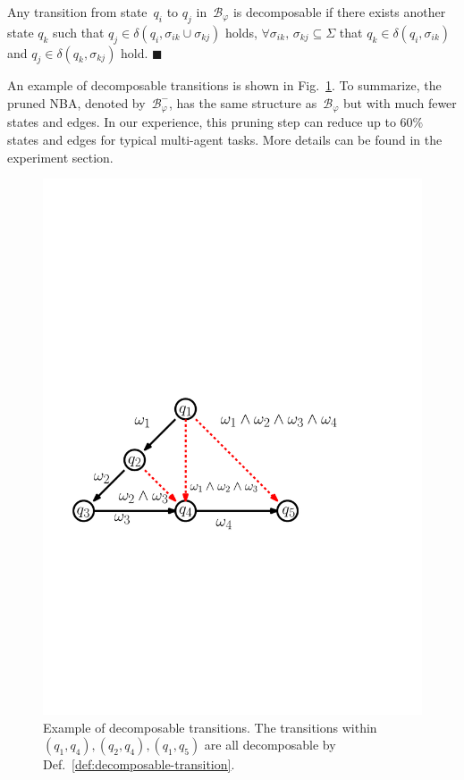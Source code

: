 \begin{definition}\label{def:decomposable-transition}
Any transition from state~$q_i$ to $q_j$ in~$\mathcal{B}_{\varphi}$ is decomposable if there exists another state $q_k$ such that $q_j\in \delta(q_i,\sigma_{ik}\cup\sigma_{kj})$ holds,
$\forall \sigma_{ik},\,\sigma_{kj} \subseteq \Sigma$ that $q_k\in \delta(q_i,\sigma_{ik})$ and $q_j\in \delta(q_k,\sigma_{kj})$ hold.
\hfill $\blacksquare$
\end{definition}

An example of decomposable transitions is shown in Fig.~\ref{fig:example_decomposable}.
To summarize, the pruned NBA, denoted by~$\mathcal{B}^{-}_{\varphi}$,
has the same structure as~$\mathcal{B}_{\varphi}$ but with much fewer states and edges.
In our experience, this pruning step can reduce up to $60\%$ states and edges for typical multi-agent tasks.
More details can be found in the experiment section.

\begin{figure}
\centering
\includegraphics[scale=0.4]{figures/example_decomposable.pdf}
\caption{
Example of decomposable transitions.
The transitions within~$(q_1,q_4),(q_2,q_4),(q_1,q_5)$
are all decomposable by Def.~\ref{def:decomposable-transition}.}
\label{fig:example_decomposable}
\end{figure}

